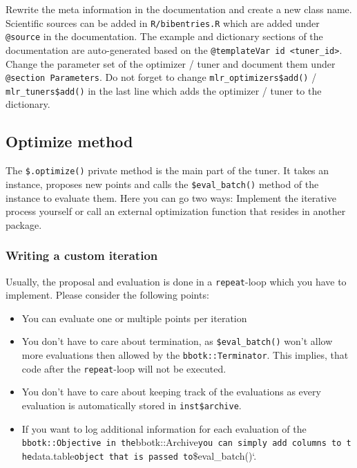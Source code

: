 \documentclass[
]{scrbook}
\providecommand{\tightlist}{%
  \setlength{\itemsep}{0pt}\setlength{\parskip}{0pt}}
\begin{document}
Rewrite the meta information in the documentation and create a new class name.
Scientific sources can be added in \texttt{R/bibentries.R} which are added under \texttt{@source} in the documentation.
The example and dictionary sections of the documentation are auto-generated based on the \texttt{@templateVar\ id\ \textless{}tuner\_id\textgreater{}}.
Change the parameter set of the optimizer / tuner and document them under \texttt{@section\ Parameters}.
Do not forget to change \texttt{mlr\_optimizers\$add()} / \texttt{mlr\_tuners\$add()} in the last line which adds the optimizer / tuner to the dictionary.

\hypertarget{tuner-optimize}{%
\subsection{Optimize method}\label{tuner-optimize}}

The \texttt{\$.optimize()} private method is the main part of the tuner.
It takes an instance, proposes new points and calls the \texttt{\$eval\_batch()} method of the instance to evaluate them.
Here you can go two ways: Implement the iterative process yourself or call an external optimization function that resides in another package.

\hypertarget{writing-a-custom-iteration}{%
\subsubsection{Writing a custom iteration}\label{writing-a-custom-iteration}}

Usually, the proposal and evaluation is done in a \texttt{repeat}-loop which you have to implement.
Please consider the following points:

\begin{itemize}
\tightlist
\item
  You can evaluate one or multiple points per iteration
\item
  You don't have to care about termination, as \texttt{\$eval\_batch()} won't allow more evaluations then allowed by the \texttt{bbotk::Terminator}. This implies, that code after the \texttt{repeat}-loop will not be executed.
\item
  You don't have to care about keeping track of the evaluations as every evaluation is automatically stored in \texttt{inst\$archive}.
\item
  If you want to log additional information for each evaluation of the \texttt{bbotk::Objective\textasciigrave{}\textasciigrave{}\ in\ the}bbotk::Archive\texttt{you\ can\ simply\ add\ columns\ to\ the}data.table\texttt{object\ that\ is\ passed\ to}\$eval\_batch()`.
\end{itemize}
\end{document}
